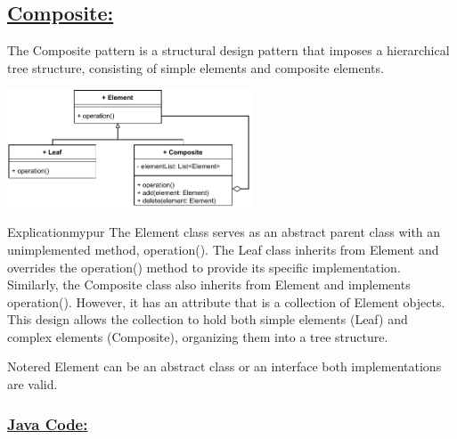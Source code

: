 \vspace{0.5cm}
\subsection*{\underline{Composite:}}
The Composite pattern is a structural design pattern that imposes a
hierarchical tree structure, consisting of simple elements and composite elements.

\begin{center}
\includegraphics[width=0.55\textwidth,height=0.35\textheight]{Chapters/DesignPattern/Composite/comp1.drawio.pdf}
\end{center}


\begin{prettyBox}{Explication}{mypur}
The Element class serves as an abstract parent class with an unimplemented method, operation().  
The Leaf class inherits from Element and overrides the operation() method to provide its specific implementation.  
Similarly, the Composite class also inherits from Element and implements operation(). However, it has an attribute that is a collection of Element objects.  
This design allows the collection to hold both simple elements (Leaf) and complex elements (Composite), organizing them into a tree structure.
\end{prettyBox}

\vspace{0.25cm}
\begin{prettyBox}{Note}{red}
Element can be an abstract class or an interface both implementations are valid.
\end{prettyBox}

\vspace{0.25cm}
\subsubsection*{\underline{Java Code:}}





